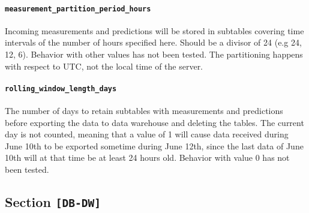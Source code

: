 \paragraph{\texttt{measurement\_partition\_period\_hours}} Incoming measurements and predictions will be stored in subtables covering time intervals of the number of hours specified here. Should be a divisor of 24 (e.g 24, 12, 6). Behavior with other values has not been tested. The partitioning happens with respect to UTC, not the local time of the server.

\paragraph{\texttt{rolling\_window\_length\_days}} The number of days to retain subtables with measurements and predictions before exporting the data to data warehouse and deleting the tables. The current day is not counted, meaning that a value of 1 will cause data received during June 10th to be exported sometime during June 12th, since the last data of June 10th will at that time be at least 24 hours old. Behavior with value 0 has not been tested.

\subsection{Section \texttt{[DB-DW]}}

